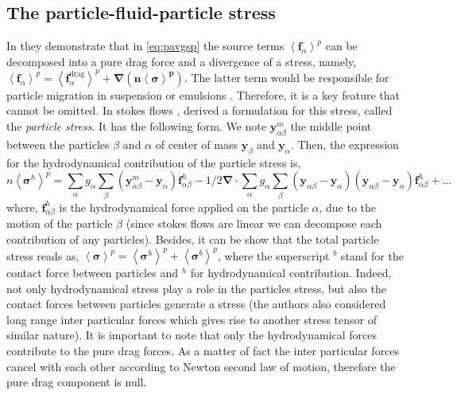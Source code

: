 \subsection{The particle-fluid-particle stress }

In \citet{nott2011suspension} they demonstrate that in \ref{eq:pavgsp} the source terms $\left<\bm{f}_\alpha\right>^p$ can be decomposed into a pure drag force and a divergence of a stress, namely, $\left<\bm{f}_\alpha\right>^p  
= \left<\bm{f}^{\text{drag}}_\alpha\right>^p
+\bm{\nabla (n\left<\sigma\right>^p)}$. 
The latter term would be responsible for particle migration in suspension or emulsions \citep[Chapter 7]{guazzelli2011}.
Therefore, it is a key feature that cannot be omitted. 
In stokes flows \cite{nott2011suspension}, derived a formulation for this stress, called the \textit{particle stress}.
It has the following form. 
We note $\bm{y}^m_{\alpha \beta}$ the middle point between the particles $\beta$ and $\alpha$ of center of mass $\bm{y}_\beta$ and $\bm{y}_\alpha$. 
Then, the expression for the hydrodynamical contribution of the particle stress is,
\begin{equation}
    \label{eq:PFP}
    n\left<\bm{\sigma}^h\right>^p
    = \sum_\alpha g_\alpha \sum_\beta (\bm{y}^m_{\alpha \beta} - \bm{y}_\alpha)\bm{f}^h_{\alpha \beta}
    -1/2\bm{\nabla}\cdot \sum_\alpha g_\alpha \sum_\beta (\bm{y}_{\alpha \beta} - \bm{y}_\alpha) (\bm{y}_{\alpha \beta} - \bm{y}_\alpha)\bm{f}^h_{\alpha \beta} 
    + \ldots
\end{equation}
where, $\bm{f}^h_{\alpha \beta}$ is the hydrodynamical force applied on the particle $\alpha$, due to the motion of the particle $\beta$ (since stokes flows are linear we can decompose each contribution of any particles). 
Besides, it can be show that the total particle stress reads as, $\left<\bm{\sigma}\right>^p = \left<\bm{\sigma}^h\right>^p+\left<\bm{\sigma}^b\right>^p$, where the superscript $^b$ stand for the contact force between particles and $^h$ for hydrodynamical contribution.
Indeed, not only hydrodynamical stress play a role in the particles stress, but also the contact forces between particles generate a stress (the authors also considered long range inter particular forces which gives rise to another stress tensor of similar nature).  
It is important to note that only the hydrodynamical forces contribute to the pure drag forces. 
As a matter of fact the inter particular forces cancel with each other according to Newton second law of motion, therefore the pure drag component is null.
